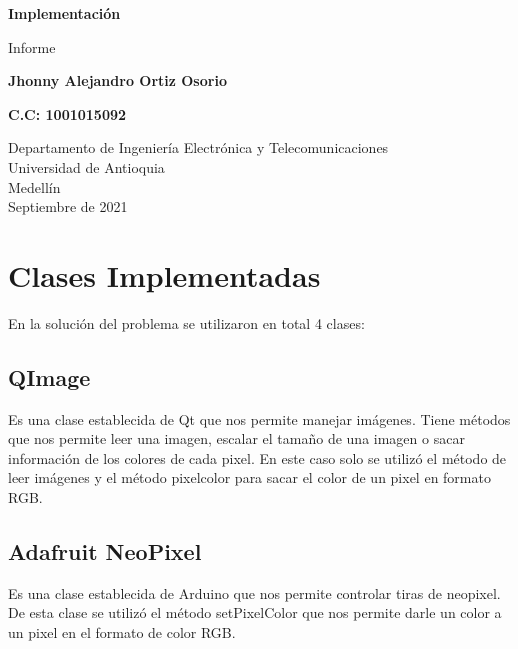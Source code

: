 \documentclass{article}
\begin{document}
\begin{titlepage}
    \begin{center}
        \vspace*{1cm} 
            
        \Huge
        \textbf{Implementación}
            
        \vspace{0.5cm}
        \LARGE
        Informe 
            
        \vspace{1.5cm}
            
        \textbf{Jhonny Alejandro Ortiz Osorio}
        
        \textbf{C.C: 1001015092}
        
        \vfill
            
        \vspace{0.8cm}
            
        \Large
        Departamento de Ingeniería Electrónica y Telecomunicaciones\\
        Universidad de Antioquia\\
        Medellín\\
        Septiembre de 2021
            
    \end{center}
\end{titlepage}


\tableofcontents
\newpage
\section{Clases Implementadas}\label{intro}
En la solución del problema se utilizaron en total 4 clases: 

\subsection{QImage}
Es una clase establecida de Qt que nos permite manejar imágenes. Tiene métodos que nos permite leer una imagen, escalar el tamaño de una imagen o sacar información de los colores de cada pixel. En este caso solo se utilizó el método de leer imágenes y el método pixelcolor para sacar el color de un pixel en formato RGB.

\subsection{Adafruit NeoPixel}
Es una clase establecida de Arduino que nos permite controlar tiras de neopixel. De esta clase se utilizó el método setPixelColor que nos permite darle un color a un pixel en el formato de color RGB.
\end{document}
